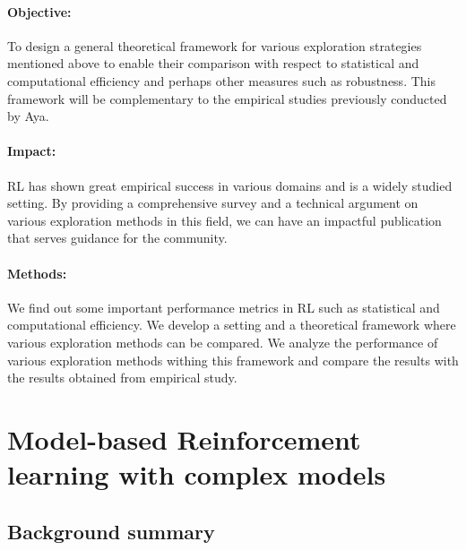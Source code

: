 \documentclass{article}
\begin{document}
\paragraph{Objective:} To design a general theoretical framework for various exploration strategies mentioned above to enable their comparison with respect to statistical and computational efficiency and perhaps other measures such as robustness. This framework will be complementary to the empirical studies previously conducted by Aya. 

\paragraph{Impact:} RL has shown great empirical success in various domains and is a widely studied setting. By providing a comprehensive survey and a technical argument on various exploration methods in this field, we can have an impactful publication that serves guidance for the community. 

\paragraph{Methods:} 
We find out some important performance metrics in RL such as statistical and computational efficiency. We develop a setting and a theoretical framework where various exploration methods can be compared. We analyze the performance of various exploration methods withing this framework and compare the results with the results obtained from empirical study.    


\section{Model-based Reinforcement learning with complex models}

\subsection{Background summary}
\end{document}
